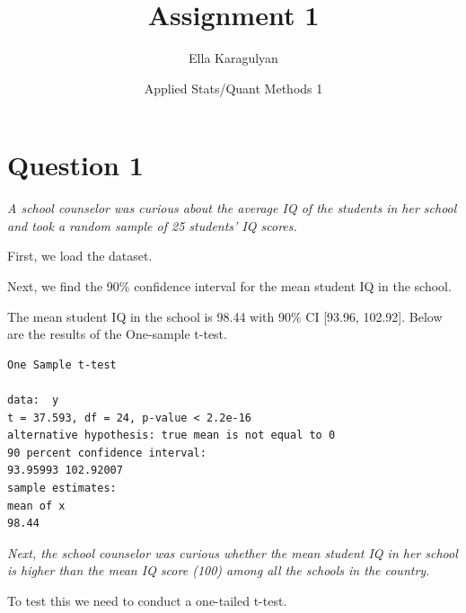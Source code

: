 \documentclass[12pt,letterpaper]{article}
\title{Assignment 1}
\date{Applied Stats/Quant Methods 1}
\author{Ella Karagulyan}
\begin{document}
	\maketitle
	
\section*{Question 1 }

\textit{A school counselor was curious about the average IQ of the students in her school and took a random sample of 25 students’ IQ scores.}\\
\vspace{.2cm}

\noindent First, we load the dataset.\\

 
\vspace{.2cm}

\noindent Next, we find the  90\% confidence interval for the mean student IQ in the school. 
\vspace{.2cm}

 
\vspace{.2cm}

\noindent The mean student IQ in the school is 98.44  with 90\% CI [93.96, 102.92]. 
Below are the  results of the One-sample t-test. \\

\begin{verbatim}
One Sample t-test

data:  y
t = 37.593, df = 24, p-value < 2.2e-16
alternative hypothesis: true mean is not equal to 0
90 percent confidence interval:
93.95993 102.92007
sample estimates:
mean of x 
98.44 
\end{verbatim}

\noindent \textit{Next, the school counselor was curious whether the mean student IQ in her school is higher than the mean IQ score (100) among all the schools in the country.}\\
\vspace{.2cm}

\noindent To test this we need to conduct a one-tailed t-test.  \\

 
\vspace{.2cm}
\end{document}
